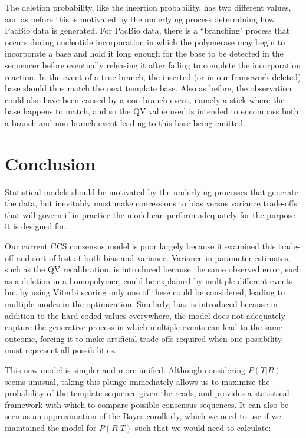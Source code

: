 \documentclass[fleqn,10pt]{SelfArx} %
\begin{document}
The deletion probability, like the insertion probability, has two different values, and as before this is motivated by the underlying process determining how PacBio data is generated.  For PacBio data, there is a ``branching" process that occurs during nucleotide incorporation in which the polymerase may begin to incorporate a base and hold it long enough for the base to be detected in the sequencer before eventually releasing it after failing to complete the incorporation reaction.  In the event of a true branch, the inserted (or in our framework deleted) base should thus match the next template base.  Also as before, the observation could also have been caused by a non-branch event, namely a stick where the base happens to match, and so the QV value used is intended to encompass both a branch and non-branch event leading to this base being emitted.





\section{Conclusion}

Statistical models should be motivated by the underlying processes that generate the data, but inevitably must make concessions to bias versus variance trade-offs that will govern if in practice the model can perform adequately for the purpose it is designed for.

Our current CCS consensus model is poor largely because it examined this trade-off and sort of lost at both bias and variance.  Variance in parameter estimates, such as the QV recalibration, is introduced because the same observed error, such as a deletion in a homopolymer, could be explained by multiple different events but by using Viterbi scoring only one of these could be considered, leading to multiple modes in the optimization.  Similarly, bias is introduced because in addition to the hard-coded values everywhere, the model does not adequately capture the generative process in which multiple events can lead to the same outcome, forcing it to make artificial trade-offs required when one possibility must represent all possibilities.

This new model is simpler and more unified.  Although considering $P(T|R)$ seems unusual, taking this plunge immediately allows us to maximize the probability of the template sequence given the reads, and provides a statistical framework with which to compare possible consensus sequences.  It can also be seen as an approximation of the Bayes corollarly, which we need to use if we maintained the model for $P(R|T)$ such that we would need to calculate:
\end{document}
